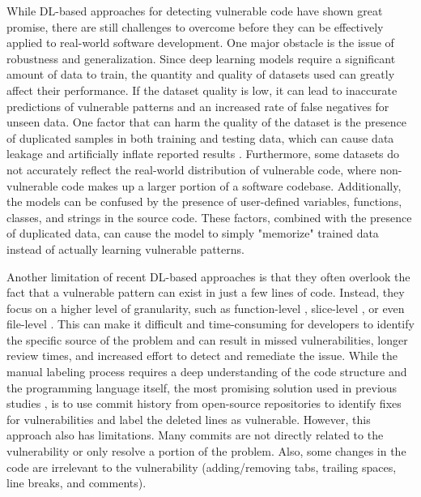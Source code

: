 \documentclass{ieeeaccess}
\begin{document}
\par %
While DL-based approaches for detecting vulnerable code have shown great promise, there are still challenges to overcome before they can be effectively applied to real-world software development. One major obstacle is the issue of robustness and generalization. Since deep learning models require a significant amount of data to train, the quantity and quality of datasets used can greatly affect their performance. If the dataset quality is low, it can lead to inaccurate predictions of vulnerable patterns and an increased rate of false negatives for unseen data. One factor that can harm the quality of the dataset is the presence of duplicated samples  in both training and testing data, which can cause data leakage and artificially inflate reported results \cite{vuldeekeeper, VUDENC, SySeVR, Are}. Furthermore, some datasets \cite{devign, sard, SATE} do not accurately reflect the real-world distribution of vulnerable code, where non-vulnerable code makes up a larger portion of a software codebase. Additionally, the models can be confused by the presence of user-defined variables, functions, classes, and strings in the source code. These factors, combined with the presence of duplicated data, can cause the model to simply "memorize" trained data instead of actually learning vulnerable patterns.

\par Another limitation of recent DL-based approaches is that they often overlook the fact that a vulnerable pattern can exist in just a few lines of code. Instead, they focus on a higher level of granularity, such as function-level \cite{Are, devign, func_level_1,func_level_2,func_level_4}, slice-level \cite{VUDENC, vuldeepeeker2, SySeVR, VulDeeLocator,vuldeekeeper}, or even file-level \cite{File_level_1, File_level_2, File_level_3, file_level_4}. This can make it difficult and time-consuming for developers to identify the specific source of the problem and can result in missed vulnerabilities, longer review times, and increased effort to detect and remediate the issue.
While the manual labeling process requires a deep understanding of the code structure and the programming language itself, the most promising solution used in previous studies \cite{Linevd, MVD}, is to use commit history from open-source repositories to identify fixes for vulnerabilities and label the deleted lines as vulnerable. However, this approach also has limitations. Many commits are not directly related to the vulnerability or only resolve a portion of the problem. Also, some changes in the code are irrelevant to the vulnerability (adding/removing tabs, trailing spaces, line breaks, and comments).
\end{document}
